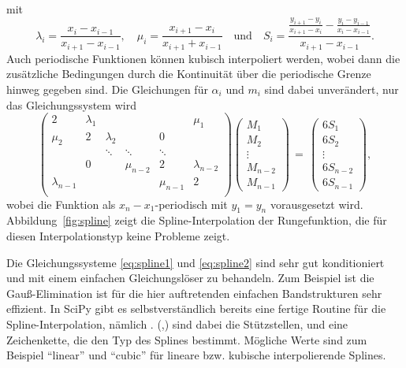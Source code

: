 mit
\begin{equation}
  \lambda_i = \frac{x_i - x_{i-1}}{x_{i+1} - x_{i-1}},\quad
  \mu_i = \frac{x_{i+1}-x_i}{x_{i+1} + x_{i-1}}\quad\text{und}\quad
  S_i = \frac{\frac{y_{i+1}-y_i}{x_{i+1} -
      x_i} - \frac{y_i-y_{i-1}}{x_i - x_{i-1}}}{x_{i+1}-x_{i-1}}.
\end{equation}
Auch periodische Funktionen können kubisch interpoliert werden, wobei
dann die zusätzliche Bedingungen durch die Kontinuität über die periodische
Grenze hinweg gegeben sind. Die Gleichungen für $\alpha_i$ und $m_i$
sind dabei unverändert, nur das Gleichungssystem wird
\begin{equation}
  \label{eq:spline2}
  \begin{pmatrix}
    2      & \lambda_1 &           &           &           &      \mu_1 \\
    \mu_2  & 2         & \lambda_2 &           & 0\\
           &           & \ddots    & \ddots    & \ddots \\
           & 0          &           & \mu_{n-2}  & 2         & \lambda_{n-2} \\
    \lambda_{n-1} &           &           &           & \mu_{n-1}  & 2         \\
  \end{pmatrix}
  \begin{pmatrix}
    M_1\\
    M_2\\
    \vdots\\
    M_{n-2}\\
    M_{n-1}
  \end{pmatrix} \,=\,
  \begin{pmatrix}
    6S_1\\
    6S_2\\
    \vdots\\
    6S_{n-2} \\
    6S_{n-1}
  \end{pmatrix},
\end{equation}
wobei die Funktion als $x_n-x_1$-periodisch mit $y_1=y_n$
vorausgesetzt wird. Abbildung~\ref{fig:spline} zeigt die
Spline-Interpolation der Rungefunktion, die für diesen
Interpolationstyp keine Probleme zeigt.

Die Gleichungssysteme \eqref{eq:spline1} und \eqref{eq:spline2} sind
sehr gut konditioniert und mit einem einfachen Gleichungslöser zu
behandeln.  Zum Beispiel ist die Gauß-Elimination ist für die hier
auftretenden einfachen Bandstrukturen sehr effizient. In SciPy gibt es
selbstverständlich bereits eine fertige Routine für die
Spline-Interpolation, nämlich . (,) sind dabei die Stützstellen, und
 eine Zeichenkette, die den Typ des Splines
bestimmt. Mögliche Werte sind zum Beispiel "`linear"' und "`cubic"'
für lineare bzw. kubische interpolierende Splines.

